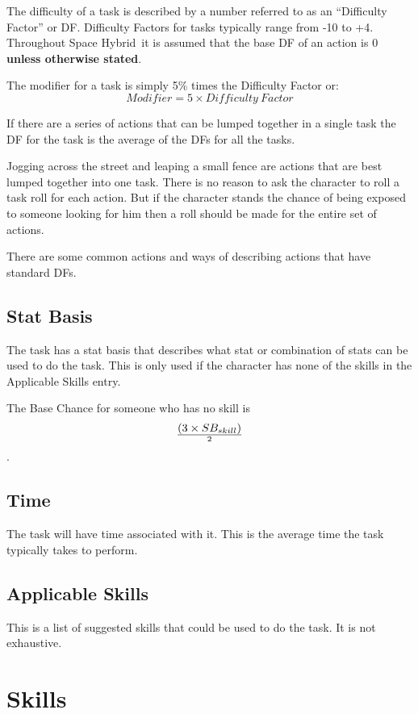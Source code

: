 The difficulty of a task is described by a number 
referred to as an ``Difficulty Factor'' or DF. Difficulty Factors 
for tasks typically range from -10  to +4. Throughout Space Hybrid\ it is 
assumed that the base DF of an action is 0 {\bf unless otherwise 
stated}. 

The modifier for a task is simply 5\% times the Difficulty Factor or:
\[ Modifier = 5 \times {Difficulty\ Factor} \]

If there are a series of actions that can be lumped 
together in a single task the DF for the task is the average of the DFs for all the tasks.

Jogging across the street and leaping a small fence are actions that 
are best lumped together into one task. There is no reason 
to ask the character to roll a task roll for each action. 
But if the character stands the chance of being exposed to
someone looking for him then a roll should be made for the entire set 
of actions. 

There are some common actions and ways of describing actions that have
standard DFs.




\subsection{Stat Basis}

The task has a stat basis that describes what stat or combination of 
stats can be used to do the task. This is only used if the character 
has none of the skills in the Applicable Skills entry. 

The Base Chance for someone who has no skill is 
\[ (3 \times SB_{skill}) \over {2} \]. 

\subsection{Time}

The task will have time associated with it. This is the average time 
the task typically takes to perform. 

\subsection{Applicable Skills}

This is a list of suggested skills that could be used to do the task. 
It is not exhaustive.

\section{Skills}

